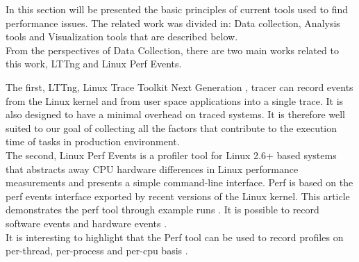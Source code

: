 
In this section will be presented the basic principles of current tools used to find performance issues. The related work was divided in: Data collection, Analysis tools and Visualization tools that are described below.\\

From the perspectives of Data Collection, there are two main works related to this work, LTTng and Linux Perf Events.

The first, LTTng, Linux Trace Toolkit Next Generation \cite{desnoyers}, tracer can record events from the Linux kernel and from user space applications into a single trace. It is also designed to have a minimal overhead on traced systems. It is therefore well suited to our goal of collecting all the factors that contribute to the execution time of tasks in production environment.\\

The second, Linux Perf Events is a profiler tool for Linux 2.6+ based systems that abstracts away CPU hardware differences in Linux performance measurements and presents a simple command-line interface. Perf is based on the perf events interface exported by recent versions of the Linux kernel. This article demonstrates the perf tool through example runs \cite{perf}. It is possible to record software events and hardware events \cite{vitillo}.\\
It is interesting to highlight that the Perf tool can be used to record profiles on per-thread, per-process and per-cpu basis \cite{perftool}.\\


